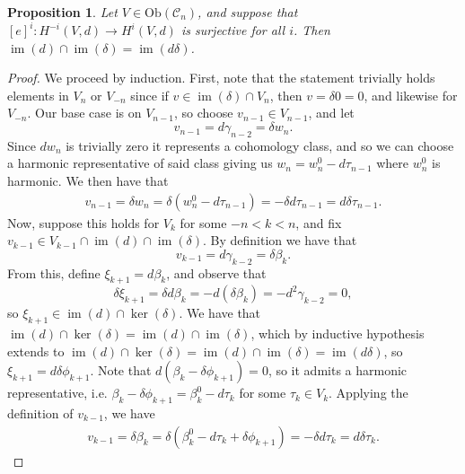 \documentclass{amsart}
\newcommand{\ra}{\rightarrow}
\newtheorem{prop}[theorem]{Proposition}
\theoremstyle{definition}
\DeclareMathOperator{\im}{im}
\begin{document}
\begin{prop}\label{SLPisddelta}
    Let $V \in \mathrm{Ob}(\mathscr{C}_n)$, and suppose that $[e]^i:H^{-i}(V,d) \ra H^i(V,d)$ is surjective for all $i$. Then $\im(d) \cap \im (\delta)= \im(d\delta)$.
\end{prop}
\begin{proof}
    We proceed by induction. First, note that the statement trivially holds elements in $V_n$ or $V_{-n}$ since if $v \in \im(\delta) \cap V_{n}$, then $v=\delta 0=0$, and likewise for $V_{-n}$. Our base case is on $V_{n-1}$, so choose $v_{n-1} \in V_{n-1}$, and let
    \begin{equation*}
        v_{n-1} = d\gamma_{n-2} = \delta w_n.
    \end{equation*}
    Since $dw_n$ is trivially zero it represents a cohomology class, and so we can choose a harmonic representative of said class giving us $w_n = w_n^0 - d \tau_{n-1}$ where $w_n^0$ is harmonic. We then have that
    \begin{align*}
        v_{n-1} = \delta w_n 
        = \delta( w_n^0 - d \tau_{n-1}) 
        =-\delta d \tau_{n-1} 
        = d \delta \tau_{n-1}.
    \end{align*}
    Now, suppose this holds for $V_k$ for some $-n<k<n$, and fix $v_{k-1}\in V_{k-1}\cap \im(d) \cap \im(\delta)$. By definition we have that 
    \begin{equation*}
    v_{k-1}=d \gamma_{k-2} = \delta \beta_k.
    \end{equation*}
    From this, define $\xi_{k+1} = d\beta_k$, and observe that
    \begin{equation*}
        \delta \xi_{k+1} = \delta d \beta_k = -d (\delta \beta_k) = -d^2\gamma_{k-2}=0,
    \end{equation*}
    so $\xi_{k+1}\in \im(d) \cap \ker(\delta)$. We have that $\im(d) \cap \ker(\delta) = \im(d) \cap \im (\delta)$, which by inductive hypothesis extends to $\im(d) \cap \ker(\delta) = \im(d) \cap \im (\delta) = \im (d\delta)$, so $\xi_{k+1}= d \delta \phi_{k+1}$. Note that $d(\beta_k - \delta \phi_{k+1})=0$, so it admits a harmonic representative, i.e. $\beta_k - \delta \phi_{k+1}=\beta_k^0 - d\tau_k$ for some $\tau_k \in V_k$. Applying the definition of $v_{k-1}$, we have 
    \begin{align*}
        v_{k-1} = \delta \beta_k 
        = \delta(\beta_k^0 - d\tau_k + \delta \phi_{k+1}) 
        = -\delta d \tau_k 
        = d \delta \tau_k.
    \end{align*}
\end{proof}
\end{document}
